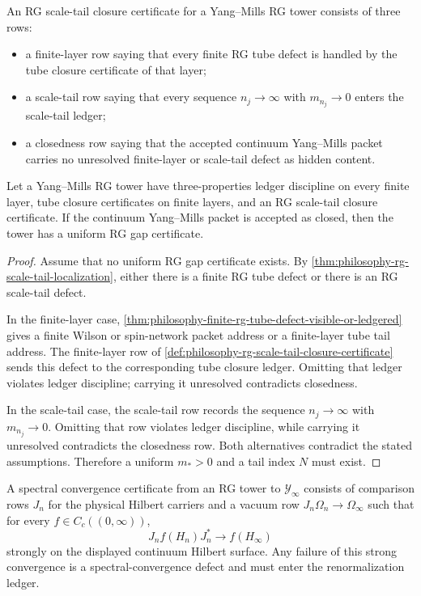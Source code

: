 \begin{definition}
\label{def:philosophy-rg-scale-tail-closure-certificate}
An RG scale-tail closure certificate for a Yang--Mills RG tower consists of
three rows:
\begin{itemize}
\item a finite-layer row saying that every finite RG tube defect is handled
by the tube closure certificate of that layer;
\item a scale-tail row saying that every sequence $n_j\to\infty$ with
$m_{n_j}\to0$ enters the scale-tail ledger;
\item a closedness row saying that the accepted continuum Yang--Mills packet
carries no unresolved finite-layer or scale-tail defect as hidden content.
\end{itemize}
\end{definition}

\begin{theorem}
\label{thm:philosophy-rg-scale-tail-closure}
Let a Yang--Mills RG tower have three-properties ledger discipline on every
finite layer, tube closure certificates on finite layers, and an RG
scale-tail closure certificate. If the continuum Yang--Mills packet is
accepted as closed, then the tower has a uniform RG gap certificate.
\end{theorem}
\begin{proof}
Assume that no uniform RG gap certificate exists. By
\autoref{thm:philosophy-rg-scale-tail-localization}, either there is a
finite RG tube defect or there is an RG scale-tail defect.

In the finite-layer case,
\autoref{thm:philosophy-finite-rg-tube-defect-visible-or-ledgered} gives a
finite Wilson or spin-network packet address or a finite-layer tube tail
address. The finite-layer row of
\autoref{def:philosophy-rg-scale-tail-closure-certificate} sends this
defect to the corresponding tube closure ledger. Omitting that ledger
violates ledger discipline; carrying it unresolved contradicts closedness.

In the scale-tail case, the scale-tail row records the sequence
$n_j\to\infty$ with $m_{n_j}\to0$. Omitting that row violates ledger
discipline, while carrying it unresolved contradicts the closedness row.
Both alternatives contradict the stated assumptions. Therefore a uniform
$m_{\ast}>0$ and a tail index $N$ must exist.
\end{proof}

\begin{definition}
\label{def:philosophy-spectral-convergence-certificate}
A spectral convergence certificate from an RG tower to
$\mathcal Y_{\infty}$ consists of comparison rows $J_n$ for the physical
Hilbert carriers and a vacuum row $J_n\Omega_n\to\Omega_{\infty}$ such that
for every $f\in C_c((0,\infty))$,
$$
J_n f(H_n)J_n^{\ast}\longrightarrow f(H_{\infty})
$$
strongly on the displayed continuum Hilbert surface. Any failure of this
strong convergence is a spectral-convergence defect and must enter the
renormalization ledger.
\end{definition}

